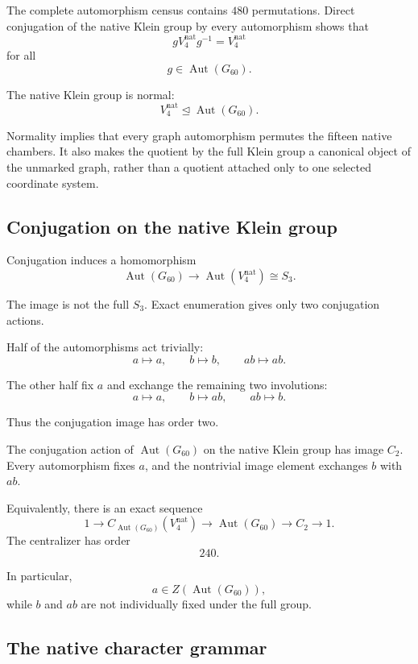 The complete automorphism census contains \(480\) permutations. Direct
conjugation of the native Klein group by every automorphism shows that
\[
gV_4^{\mathrm{nat}}g^{-1}
=
V_4^{\mathrm{nat}}
\]
for all
\[
g\in\operatorname{Aut}(G_{60}).
\]

\begin{theorem}
The native Klein group is normal:
\[
V_4^{\mathrm{nat}}
\trianglelefteq
\operatorname{Aut}(G_{60}).
\]
\end{theorem}

Normality implies that every graph automorphism permutes the fifteen
native chambers. It also makes the quotient by the full Klein group a
canonical object of the unmarked graph, rather than a quotient attached
only to one selected coordinate system.

\subsection{Conjugation on the native Klein group}

Conjugation induces a homomorphism
\[
\operatorname{Aut}(G_{60})
\longrightarrow
\operatorname{Aut}(V_4^{\mathrm{nat}})
\cong S_3.
\]

The image is not the full \(S_3\). Exact enumeration gives only two
conjugation actions.

Half of the automorphisms act trivially:
\[
a\mapsto a,
\qquad
b\mapsto b,
\qquad
ab\mapsto ab.
\]

The other half fix \(a\) and exchange the remaining two involutions:
\[
a\mapsto a,
\qquad
b\mapsto ab,
\qquad
ab\mapsto b.
\]

Thus the conjugation image has order two.

\begin{theorem}
The conjugation action of
\(\operatorname{Aut}(G_{60})\) on the native Klein group has image
\(C_2\). Every automorphism fixes \(a\), and the nontrivial image
element exchanges \(b\) with \(ab\).
\end{theorem}

Equivalently, there is an exact sequence
\[
1
\longrightarrow
C_{\operatorname{Aut}(G_{60})}(V_4^{\mathrm{nat}})
\longrightarrow
\operatorname{Aut}(G_{60})
\longrightarrow
C_2
\longrightarrow
1.
\]
The centralizer has order
\[
240.
\]

In particular,
\[
a\in Z(\operatorname{Aut}(G_{60})),
\]
while \(b\) and \(ab\) are not individually fixed under the full group.

\subsection{The native character grammar}


